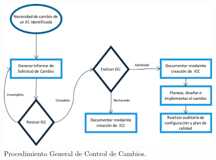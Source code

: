 \begin{figure}[hb]
\begin{center}
\includegraphics[width=1\textwidth]{./img/planAprobacion}
\end{center}
\caption{Procedimiento General de Control de Cambios.}
\label{img:planAprobCambios}
\end{figure}

